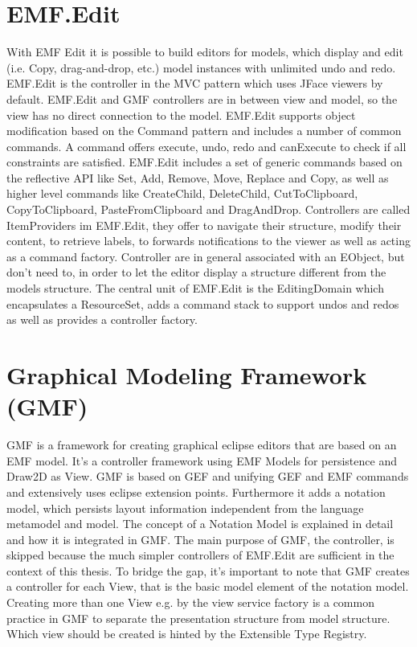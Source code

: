 \section{EMF.Edit}
With EMF Edit it is possible to build editors for models, which display and edit (i.e. Copy, drag-and-drop, etc.) model instances with unlimited undo and redo. EMF.Edit is the controller in the MVC pattern which uses JFace viewers by default. EMF.Edit and GMF controllers are in between view and model, so the view has no direct connection to the model. EMF.Edit supports object modification based on the Command pattern and includes a number of common commands. A command  offers execute, undo, redo and canExecute to check if all constraints are satisfied.  EMF.Edit includes a set of generic commands based on the reflective API like Set, Add, Remove, Move, Replace and Copy, as well as  higher level commands like CreateChild, DeleteChild, CutToClipboard, CopyToClipboard, PasteFromClipboard and DragAndDrop. Controllers are called ItemProviders im EMF.Edit, they offer to navigate their structure, modify their content, to retrieve labels, to forwards notifications to the viewer as well as acting as a command factory. Controller are in general associated with an EObject, but don't need to, in order to let the editor display a structure different from the models structure. The central unit of EMF.Edit is the EditingDomain which encapsulates a ResourceSet, adds a command stack to support undos and redos as well as provides a controller factory. \cite{EMF2nd} 


\section {Graphical Modeling Framework (GMF)}
GMF is a framework for creating graphical eclipse editors that are based on an EMF model. It's a controller framework using EMF Models for persistence and Draw2D as View. GMF is based on GEF and unifying GEF and EMF commands and extensively uses eclipse extension points. Furthermore it adds a notation model, which persists layout information independent from the language metamodel and model. The concept of a Notation Model is explained in detail and how it is integrated in GMF. The main purpose of GMF, the controller, is skipped because the much simpler controllers of EMF.Edit are sufficient in the context of this thesis. To bridge the gap, it's important to note that GMF creates a controller for each View, that is the basic model element of the notation model. Creating more than one View e.g. by the view service factory is a common practice in GMF to separate the presentation structure from model structure. Which view should be created is hinted by the Extensible Type Registry.

